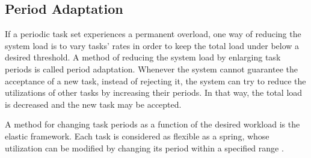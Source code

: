 
\newpage
\subsection{Period Adaptation}
If a periodic task set experiences a permanent overload, one way of reducing the system load is to vary tasks' rates in order to keep the total load under below a desired threshold.
A method of reducing the system load by enlarging task periods is called period adaptation. 
Whenever the system cannot guarantee the acceptance of a new task, instead of rejecting it, the system can try to reduce the utilizations of other tasks by increasing their periods. In that way, the total load is decreased and the new task may be accepted.

A method for changing task periods as a function of the desired workload is the elastic framework. Each task is considered as flexible as a spring, whose utilization can be modified by changing its period within a specified range 
\cite{lee2007handbook}.

